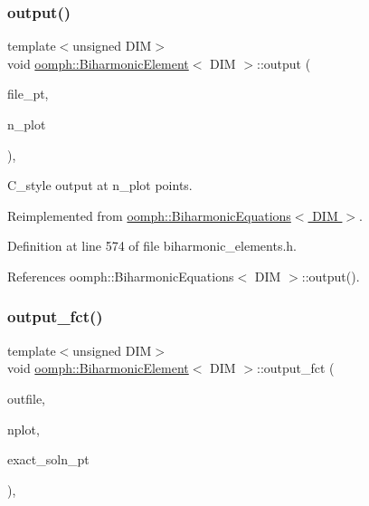 \subsubsection{\texorpdfstring{output()}{output()}\hspace{0.1cm}{\footnotesize\ttfamily [4/4]}}
{\footnotesize\ttfamily template$<$unsigned D\+IM$>$ \\
void \hyperlink{classoomph_1_1BiharmonicElement}{oomph\+::\+Biharmonic\+Element}$<$ D\+IM $>$\+::output (\begin{DoxyParamCaption}\item[{F\+I\+LE $\ast$}]{file\+\_\+pt,  }\item[{const unsigned \&}]{n\+\_\+plot }\end{DoxyParamCaption})\hspace{0.3cm}{\ttfamily [inline]}, {\ttfamily [virtual]}}



C\+\_\+style output at n\+\_\+plot points. 



Reimplemented from \hyperlink{classoomph_1_1BiharmonicEquations_af0fa36f6c36da7cfaf8f28f3609a0c6c}{oomph\+::\+Biharmonic\+Equations$<$ D\+I\+M $>$}.



Definition at line 574 of file biharmonic\+\_\+elements.\+h.



References oomph\+::\+Biharmonic\+Equations$<$ D\+I\+M $>$\+::output().

\mbox{\label{classoomph_1_1BiharmonicElement_a1c2dd136ac2a0f263c6a444a3db5a750}} 
\subsubsection{\texorpdfstring{output\+\_\+fct()}{output\_fct()}\hspace{0.1cm}{\footnotesize\ttfamily [1/2]}}
{\footnotesize\ttfamily template$<$unsigned D\+IM$>$ \\
void \hyperlink{classoomph_1_1BiharmonicElement}{oomph\+::\+Biharmonic\+Element}$<$ D\+IM $>$\+::output\+\_\+fct (\begin{DoxyParamCaption}\item[{std\+::ostream \&}]{outfile,  }\item[{const unsigned \&}]{nplot,  }\item[{\hyperlink{classoomph_1_1FiniteElement_a690fd33af26cc3e84f39bba6d5a85202}{Finite\+Element\+::\+Steady\+Exact\+Solution\+Fct\+Pt}}]{exact\+\_\+soln\+\_\+pt }\end{DoxyParamCaption})\hspace{0.3cm}{\ttfamily [inline]}, {\ttfamily [virtual]}}



